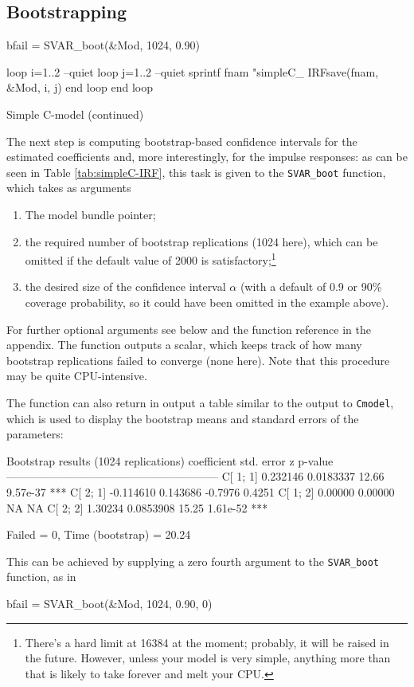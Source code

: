 \documentclass[a4paper,10pt]{article}
\begin{document}
\subsection{Bootstrapping}
\label{sec:bootstrap}

\begin{table}[htbp]
\begin{scode}
  bfail = SVAR_boot(&Mod, 1024, 0.90)

  loop i=1..2 --quiet
      loop j=1..2 --quiet
          sprintf fnam "simpleC_%
          IRFsave(fnam, &Mod, i, j)
      end loop
  end loop
  \end{scode}
  \caption{Simple C-model (continued)}
  \label{tab:simpleC-IRF}
\end{table}

The next step is computing bootstrap-based confidence intervals for
the estimated coefficients and, more interestingly, for the impulse
responses: as can be seen in Table \ref{tab:simpleC-IRF}, this task is
given to the \texttt{SVAR\_boot} function, which takes as arguments
\begin{enumerate}
\item The model bundle pointer;
\item the required number of bootstrap replications (1024
  here), which can be omitted if the default value of 2000 is 
    satisfactory;\footnote{There's a hard limit at 16384 at the moment;
    probably, it will be raised in the future. However, unless your
    model is very simple, anything more than that is likely to take
    forever and melt your CPU.}
\item the desired size of the confidence interval $\alpha$ (with a default 
  of 0.9 or 90\% coverage probability, so it could have been omitted in the 
  example above).
\end{enumerate}

For further optional arguments see below and the function reference in the 
appendix.
The function outputs a scalar, which keeps track of how many bootstrap
replications failed to converge (none here). Note that this procedure
may be quite CPU-intensive. 

The function can also return in output a table similar to the output
to \texttt{Cmodel}, which is used to display the bootstrap means and
standard errors of the parameters:
\begin{code}
Bootstrap results (1024 replications)
             coefficient   std. error      z       p-value 
  ---------------------------------------------------------
  C[ 1; 1]     0.232146    0.0183337    12.66      9.57e-37 ***
  C[ 2; 1]    -0.114610    0.143686     -0.7976    0.4251  
  C[ 1; 2]     0.00000     0.00000      NA        NA       
  C[ 2; 2]     1.30234     0.0853908    15.25      1.61e-52 ***

Failed = 0, Time (bootstrap) = 20.24
\end{code}
This can be achieved by supplying a zero fourth argument to the
\texttt{SVAR\_boot} function, as in
\begin{code}
  bfail = SVAR_boot(&Mod, 1024, 0.90, 0)
\end{code}
\end{document}
